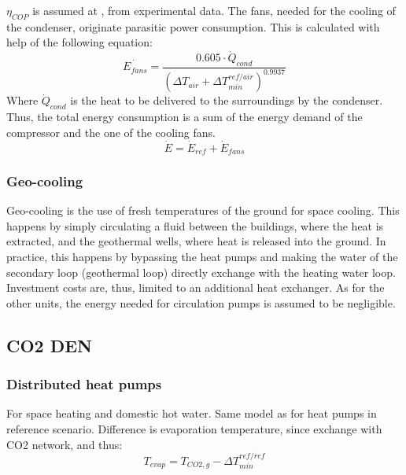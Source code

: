 \documentclass{article}
\begin{document}
$\eta_{COP}$ is assumed at , from experimental data\cite{girardinEnerGisGeographicalInformation2010}.
The fans, needed for the cooling of the condenser, originate parasitic power consumption. This is calculated with help of the following equation\cite{henchozPotentialRefrigerantBased}:
\begin{equation}
    \dot{E_{fans}} = \frac{0.605 \cdot \dot{Q}_{cond}}{( \Delta T_{air} + \Delta T_{min}^{ref/air})^{0.9937}}
\end{equation}
Where $\dot{Q}_{cond}$ is the heat to be delivered to the surroundings by the condenser. Thus, the total energy consumption is a sum of the energy demand of the compressor and the one of the cooling fans.
\begin{equation}
    \dot{E} = \dot{E}_{ref} + \dot{E}_{fans}
\end{equation}

\subsubsection{Geo-cooling}
Geo-cooling is the use of fresh temperatures of the ground for space cooling. This happens by simply circulating a fluid between the buildings, where the heat is extracted, and the geothermal wells, where heat is released into the ground. In practice, this happens by bypassing the heat pumps and making the water of the secondary loop (geothermal loop) directly exchange with the heating water loop. Investment costs are, thus, limited to an additional heat exchanger. As for the other units, the energy needed for circulation pumps is assumed to be negligible. 


\subsection{CO2 DEN}

\subsubsection{Distributed heat pumps}
For space heating and domestic hot water.
Same model as for heat pumps in reference scenario. 
Difference is evaporation temperature, since exchange with CO2 network, and thus:
\begin{equation}
    T_{evap} = T_{CO2,g} - \Delta T_{min}^{ref/ref}
\end{equation}
\end{document}
